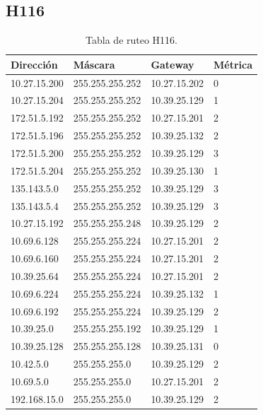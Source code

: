 \documentclass[12pt,titlepage]{article}
\begin{document}
\subsection{H116}
\begin{table}
  \begin{center}
    \begin{tabular}{|l|l|l|l|}
      \hline
        \bf{Direcci\'on} & \bf{M\'ascara} & \bf{Gateway} & \bf{M\'etrica} \\
      \hline 
	10.27.15.200  & 255.255.255.252 & 10.27.15.202 & 0 \\
        10.27.15.204  & 255.255.255.252 & 10.39.25.129 & 1 \\
        172.51.5.192  & 255.255.255.252 & 10.27.15.201 & 2 \\
        172.51.5.196  & 255.255.255.252 & 10.39.25.132 & 2 \\
        172.51.5.200  & 255.255.255.252 & 10.39.25.129 & 3 \\
        172.51.5.204  & 255.255.255.252 & 10.39.25.130 & 1 \\
        135.143.5.0   & 255.255.255.252 & 10.39.25.129 & 3 \\
        135.143.5.4   & 255.255.255.252 & 10.39.25.129 & 3 \\ 	
	10.27.15.192  & 255.255.255.248 & 10.39.25.129 & 2 \\
	10.69.6.128   & 255.255.255.224 & 10.27.15.201 & 2 \\
        10.69.6.160   & 255.255.255.224 & 10.27.15.201 & 2 \\
	10.39.25.64   & 255.255.255.224 & 10.27.15.201 & 2 \\       
	10.69.6.224   & 255.255.255.224 & 10.39.25.132 & 1 \\
	10.69.6.192   & 255.255.255.224 & 10.39.25.129 & 2 \\	
	10.39.25.0    & 255.255.255.192 & 10.39.25.129 & 1 \\
	10.39.25.128  & 255.255.255.128 & 10.39.25.131 & 0 \\
	10.42.5.0     & 255.255.255.0 & 10.39.25.129 & 2 \\
        10.69.5.0     & 255.255.255.0 & 10.27.15.201 & 2 \\
        192.168.15.0  & 255.255.255.0 & 10.39.25.129 & 2 \\  
    \hline
    \end{tabular} \\
  \end{center}
  \caption{Tabla de ruteo H116.}
\end{table}
\FloatBarrier
\end{document}
